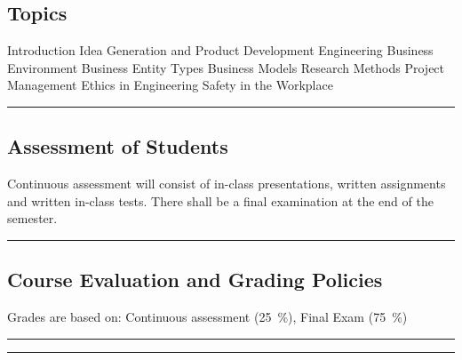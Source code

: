 \subsection*{Topics}
\begin{outline}
    \1 Introduction
    \1 Idea Generation and Product Development
    \1 Engineering Business Environment
    \1 Business Entity Types
    \1 Business Models
    \1 Research Methods
    \1 Project Management
    \1 Ethics in Engineering
    \1 Safety in the Workplace
\end{outline}
\vspace{2ex} \hrule\vspace{2ex}

\subsection*{Assessment of Students}
\begin{outline}
    \1 Continuous assessment will consist of in-class presentations, written assignments and written in-class tests.
    \1 There shall be a final examination at the end of the semester.
\end{outline}
\vspace{2ex}\hrule\vspace{2ex}

\subsection*{Course Evaluation and Grading Policies}
Grades are based on:
Continuous assessment (\qty{25}{\percent}),
Final Exam (\qty{75}{\percent})
\vspace{2ex}\hrule
\vspace{2ex}\hrule\vspace{2ex}